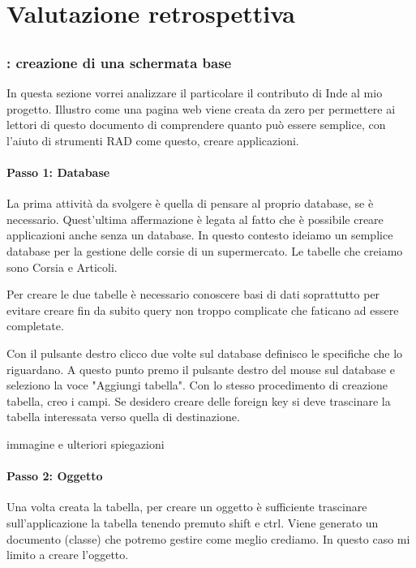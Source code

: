 \chapter{Valutazione retrospettiva}
\section{\inde}

\subsection{\inde: creazione di una schermata base}
In questa sezione vorrei analizzare il particolare il contributo di Inde al mio progetto. Illustro come una pagina web viene creata da zero per permettere ai lettori di questo documento di comprendere quanto può essere semplice, con l'aiuto di strumenti RAD come questo, creare applicazioni.

\subsubsection{Passo 1: Database}
La prima attività da svolgere è quella di pensare al proprio database, se è necessario. Quest'ultima affermazione è legata al fatto che è possibile creare applicazioni anche senza un database.
In questo contesto ideiamo un semplice database per la gestione delle corsie di un supermercato. Le tabelle che creiamo sono Corsia e Articoli.

Per creare le due tabelle è necessario conoscere basi di dati soprattutto per evitare creare fin da subito query non troppo complicate che faticano ad essere completate. 

Con il pulsante destro clicco due volte sul database definisco le specifiche che lo riguardano. A questo punto premo il pulsante destro del mouse sul database e seleziono la voce "Aggiungi tabella". Con lo stesso procedimento di creazione tabella, creo i campi.
Se desidero creare delle foreign key si deve trascinare la tabella interessata verso quella di destinazione.  

\todo immagine e ulteriori spiegazioni

\subsubsection{Passo 2: Oggetto}
Una volta creata la tabella, per creare un oggetto è sufficiente trascinare sull'applicazione la tabella tenendo premuto shift e ctrl. Viene generato un documento (classe) che potremo gestire come meglio crediamo. In questo caso mi limito a creare l'oggetto.


